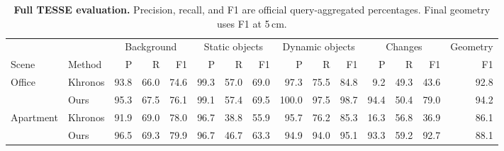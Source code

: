 \begin{table}[t]
\centering
\fontsize{9}{10.3}\selectfont
\setlength{\tabcolsep}{2.3pt}
\renewcommand{\arraystretch}{1.08}
\begin{tabular}{@{}ll*{13}{r}@{}}
\toprule
& & \multicolumn{3}{c}{Background} & \multicolumn{3}{c}{Static objects} & \multicolumn{3}{c}{Dynamic objects} & \multicolumn{3}{c}{Changes} & Geometry \\
\cmidrule(lr){3-5}\cmidrule(lr){6-8}\cmidrule(lr){9-11}\cmidrule(lr){12-14}
Scene & Method & P & R & F1 & P & R & F1 & P & R & F1 & P & R & F1 & F1 \\ \midrule
Office & Khronos & 93.8 & 66.0 & 74.6 & 99.3 & 57.0 & 69.0 & 97.3 & 75.5 & 84.8 & 9.2 & 49.3 & 43.6 & 92.8 \\
 & Ours & 95.3 & 67.5 & 76.1 & 99.1 & 57.4 & 69.5 & 100.0 & 97.5 & 98.7 & 94.4 & 50.4 & 79.0 & 94.2 \\
\midrule
Apartment & Khronos & 91.9 & 69.0 & 78.0 & 96.7 & 38.8 & 55.9 & 95.7 & 76.2 & 85.3 & 16.3 & 56.8 & 36.9 & 86.1 \\
 & Ours & 96.5 & 69.3 & 79.9 & 96.7 & 46.7 & 63.3 & 94.9 & 94.0 & 95.1 & 93.3 & 59.2 & 92.7 & 88.1 \\
\bottomrule
\end{tabular}
\caption{\textbf{Full TESSE evaluation.} Precision, recall, and F1 are official query-aggregated percentages. Final geometry uses F1 at 5\,cm.}
\label{tab:supp_tesse}
\end{table}
